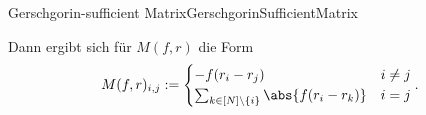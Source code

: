 \begin{mcor}{Gerschgorin-sufficient Matrix}{GerschgorinSufficientMatrix}
            
    Dann ergibt sich für $M(f,r)$ die Form
    \[
        M(f,r)_{i,j} := \begin{cases}
            -f(r_i-r_j) & i\neq j\\
            \sum_{k\in[N]\setminus\{i\}}\abs{f(r_i-r_k)} & i = j
        \end{cases}.
    \]
\end{mcor}